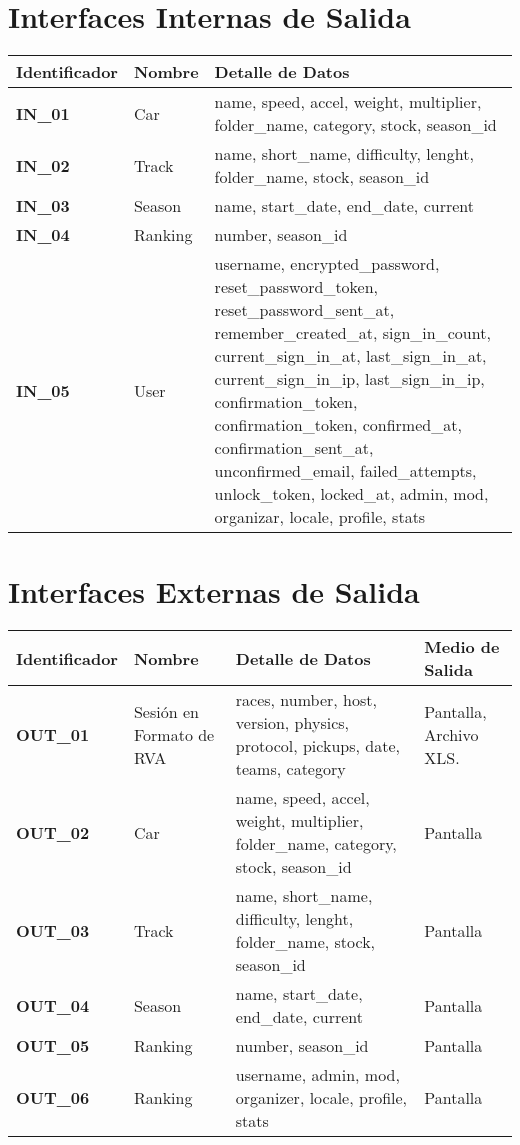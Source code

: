 \section{Interfaces Internas de Salida}

\begin{center}
	\begin{tabular}{ | l | p{5.5cm} | p{8cm} |}
		\hline
		{\textbf{Identificador}} & 	{\textbf{Nombre}} & {\textbf{Detalle de Datos}} \\ \hline
		{\textbf{IN\_01}} & Car & name, speed, accel, weight, multiplier, folder\_name, category, stock, season\_id \\ \hline
		{\textbf{IN\_02}} & Track &  name, short\_name, difficulty, lenght, folder\_name, stock, season\_id \\ \hline
		{\textbf{IN\_03}} & Season & name, start\_date, end\_date, current \\ \hline
		{\textbf{IN\_04}} & Ranking & number, season\_id \\ \hline
		{\textbf{IN\_05}} & User & username, encrypted\_password, reset\_password\_token, reset\_password\_sent\_at, remember\_created\_at, sign\_in\_count, current\_sign\_in\_at, last\_sign\_in\_at, current\_sign\_in\_ip, last\_sign\_in\_ip, confirmation\_token, confirmation\_token, confirmed\_at, confirmation\_sent\_at, unconfirmed\_email, failed\_attempts, unlock\_token, locked\_at, admin, mod, organizar, locale, profile, stats \\ \hline
	\end{tabular}
\end{center}

\newpage

\section{Interfaces Externas de Salida}

\begin{center}
	\begin{tabular}{ | l | p{3.5cm} | p{6cm} | p{4cm} |}
		\hline
		{\textbf{Identificador}} & 	{\textbf{Nombre}} & {\textbf{Detalle de Datos}} & {\textbf{Medio de Salida}} \\
		\hline
		{\textbf{OUT\_01}} & Sesión en Formato de RVA & races, number, host, version, physics, protocol, pickups, date, teams, category & Pantalla, Archivo XLS. \\ \hline
		{\textbf{OUT\_02}} & Car & name, speed, accel, weight, multiplier, folder\_name, category, stock, season\_id & Pantalla \\ \hline
		{\textbf{OUT\_03}} & Track & name, short\_name, difficulty, lenght, folder\_name, stock, season\_id & Pantalla \\ \hline
		{\textbf{OUT\_04}} & Season & name, start\_date, end\_date, current & Pantalla \\ \hline
		{\textbf{OUT\_05}} & Ranking & number, season\_id & Pantalla \\ \hline
		{\textbf{OUT\_06}} & Ranking & username, admin, mod, organizer, locale, profile, stats & Pantalla \\ \hline
	\end{tabular}
\end{center}
